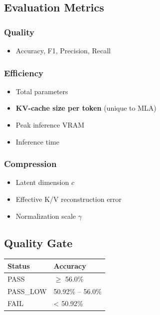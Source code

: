 \subsection{Evaluation Metrics}

\subsubsection{Quality}
\begin{itemize}
\item Accuracy, F1, Precision, Recall

\end{itemize}
\subsubsection{Efficiency}
\begin{itemize}
\item Total parameters
\item \textbf{KV-cache size per token} (unique to MLA)
\item Peak inference VRAM
\item Inference time

\end{itemize}
\subsubsection{Compression}
\begin{itemize}
\item Latent dimension $c$
\item Effective K/V reconstruction error
\item Normalization scale $\gamma$

\end{itemize}
\subsection{Quality Gate}

\begin{table}[H]
\centering
\small
\begin{tabular}{ll}
\toprule
\textbf{Status} & \textbf{Accuracy} \\
\midrule
PASS & $\ge$ 56.0\% \\
PASS\_LOW & 50.92\% -- 56.0\% \\
FAIL & < 50.92\% \\
\bottomrule
\end{tabular}
\end{table}

